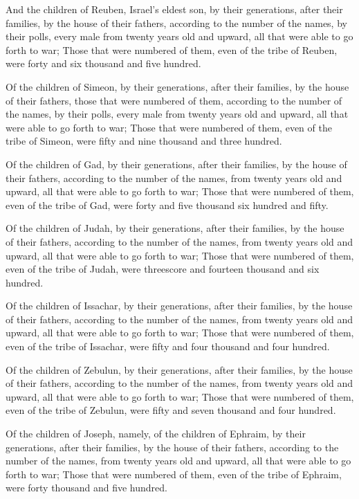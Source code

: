 \verse And the children of Reuben, Israel's eldest son, by their
generations, after their families, by the house of their fathers,
according to the number of the names, by their polls, every male from
twenty years old and upward, all that were able to go forth to war;
\verse Those that were numbered of them, even of the tribe of Reuben,
were forty and six thousand and five hundred.

\verse Of the children of Simeon, by their generations, after their
families, by the house of their fathers, those that were numbered of
them, according to the number of the names, by their polls, every male
from twenty years old and upward, all that were able to go forth to
war; \verse Those that were numbered of them, even of the tribe of
Simeon, were fifty and nine thousand and three hundred.

\verse Of the children of Gad, by their generations, after their
families, by the house of their fathers, according to the number of
the names, from twenty years old and upward, all that were able to go
forth to war; \verse Those that were numbered of them, even of the tribe
of Gad, were forty and five thousand six hundred and fifty.

\verse Of the children of Judah, by their generations, after their
families, by the house of their fathers, according to the number of
the names, from twenty years old and upward, all that were able to go
forth to war; \verse Those that were numbered of them, even of the tribe
of Judah, were threescore and fourteen thousand and six hundred.

\verse Of the children of Issachar, by their generations, after their
families, by the house of their fathers, according to the number of
the names, from twenty years old and upward, all that were able to go
forth to war; \verse Those that were numbered of them, even of the tribe
of Issachar, were fifty and four thousand and four hundred.

\verse Of the children of Zebulun, by their generations, after their
families, by the house of their fathers, according to the number of
the names, from twenty years old and upward, all that were able to go
forth to war; \verse Those that were numbered of them, even of the tribe
of Zebulun, were fifty and seven thousand and four hundred.

\verse Of the children of Joseph, namely, of the children of Ephraim, by
their generations, after their families, by the house of their
fathers, according to the number of the names, from twenty years old
and upward, all that were able to go forth to war; \verse Those that
were numbered of them, even of the tribe of Ephraim, were forty
thousand and five hundred.

